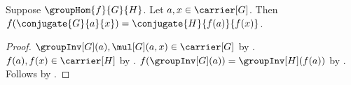 \begin{theorem}\label{group_hom_conjugate}
    Suppose $\groupHom{f}{G}{H}$.
    Let $a,x\in\carrier[G]$.
    Then
        $f(\conjugate{G}{a}{x})=
            \conjugate{H}{f(a)}{f(x)}$.
\end{theorem}
\begin{proof}
    $\groupInv[G](a),\mul[G](a,x)\in\carrier[G]$ by
        .
    $f(a),f(x)\in\carrier[H]$ by
        .
    $f(\groupInv[G](a))=\groupInv[H](f(a))$ by
        .
    Follows by
        .
\end{proof}
